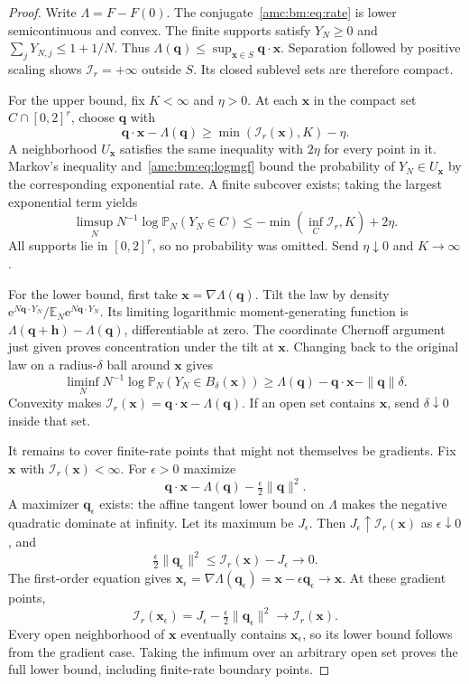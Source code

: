 \documentclass[11pt,letterpaper]{article}
\theoremstyle{remark}\newtheorem{remark}[theorem]{Remark}
\newcommand{\ee}{\mathrm e}
\newcommand{\bx}{\boldsymbol x}
\begin{document}
\begin{proof}
Write $\Lambda=F-F(0)$. The conjugate~\eqref{amc:bm:eq:rate} is lower semicontinuous and convex. The finite supports satisfy $Y_N\ge0$ and $\sum_jY_{N,j}\le1+1/N$. Thus
$\Lambda(\boldsymbol q)\le\sup_{\bx\in S}\boldsymbol q\cdot\bx$.
Separation followed by positive scaling shows $\mathcal I_r=+\infty$ outside $S$. Its closed sublevel sets are therefore compact.

For the upper bound, fix $K<\infty$ and $\eta>0$. At each $\bx$ in the compact set $C\cap[0,2]^r$, choose $\boldsymbol q$ with
\[
 \boldsymbol q\cdot\bx-\Lambda(\boldsymbol q)
 \ge\min(\mathcal I_r(\bx),K)-\eta.
\]
A neighborhood $U_{\bx}$ satisfies the same inequality with $2\eta$ for every point in it. Markov's inequality and~\eqref{amc:bm:eq:logmgf} bound the probability of $Y_N\in U_{\bx}$ by the corresponding exponential rate. A finite subcover exists; taking the largest exponential term yields
\[
 \limsup_N N^{-1}\log\mathbb P_N(Y_N\in C)
 \le-\min(\inf_C\mathcal I_r,K)+2\eta.
\]
All supports lie in $[0,2]^r$, so no probability was omitted. Send $\eta\downarrow0$ and $K\to\infty$.

For the lower bound, first take $\bx=\nabla\Lambda(\boldsymbol q)$. Tilt the law by density
$\ee^{N\boldsymbol q\cdot Y_N}/\mathbb E_N\ee^{N\boldsymbol q\cdot Y_N}$.
Its limiting logarithmic moment-generating function is
$\Lambda(\boldsymbol q+\boldsymbol h)-\Lambda(\boldsymbol q)$, differentiable at zero. The coordinate Chernoff argument just given proves concentration under the tilt at $\bx$. Changing back to the original law on a radius-$\delta$ ball around $\bx$ gives
\[
 \liminf_N N^{-1}\log\mathbb P_N(Y_N\in B_\delta(\bx))
 \ge\Lambda(\boldsymbol q)-\boldsymbol q\cdot\bx
       -\|\boldsymbol q\|\delta.
\]
Convexity makes $\mathcal I_r(\bx)=\boldsymbol q\cdot\bx-\Lambda(\boldsymbol q)$. If an open set contains $\bx$, send $\delta\downarrow0$ inside that set.

It remains to cover finite-rate points that might not themselves be gradients. Fix $\bx$ with $\mathcal I_r(\bx)<\infty$. For $\epsilon>0$ maximize
\[
 \boldsymbol q\cdot\bx-\Lambda(\boldsymbol q)
        -\tfrac\epsilon2\|\boldsymbol q\|^2.
\]
A maximizer $\boldsymbol q_\epsilon$ exists: the affine tangent lower bound on $\Lambda$ makes the negative quadratic dominate at infinity. Let its maximum be $J_\epsilon$. Then $J_\epsilon\uparrow\mathcal I_r(\bx)$ as $\epsilon\downarrow0$, and
\[
 \tfrac\epsilon2\|\boldsymbol q_\epsilon\|^2
 \le\mathcal I_r(\bx)-J_\epsilon\longrightarrow0.
\]
The first-order equation gives
$\bx_\epsilon=\nabla\Lambda(\boldsymbol q_\epsilon)
=\bx-\epsilon\boldsymbol q_\epsilon\to\bx$. At these gradient points,
\[
 \mathcal I_r(\bx_\epsilon)
 =J_\epsilon-\tfrac\epsilon2\|\boldsymbol q_\epsilon\|^2
 \longrightarrow\mathcal I_r(\bx).
\]
Every open neighborhood of $\bx$ eventually contains $\bx_\epsilon$, so its lower bound follows from the gradient case. Taking the infimum over an arbitrary open set proves the full lower bound, including finite-rate boundary points.


\end{proof}
\end{document}
